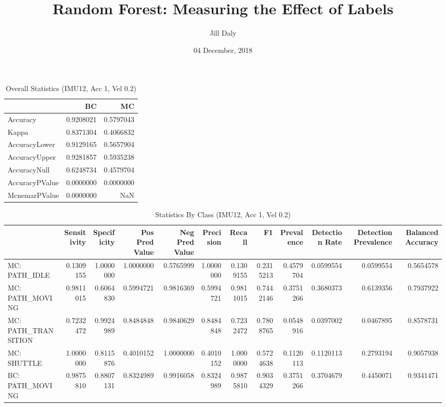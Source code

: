 \documentclass[]{article}
\title{Random Forest: Measuring the Effect of Labels}
\author{Jill Daly}
\date{04 December, 2018}
\begin{document}
\maketitle

\begin{table}[!h]

\caption{\label{tab:overall_accuracy_chunk}Overall Statistics (IMU12, Acc 1, Vel 0.2)}
\centering
\begin{tabular}[t]{lrr}
\toprule
  & BC & MC\\
\midrule
Accuracy & 0.9208021 & 0.5797043\\
Kappa & 0.8371304 & 0.4066832\\
AccuracyLower & 0.9129165 & 0.5657904\\
AccuracyUpper & 0.9281857 & 0.5935238\\
AccuracyNull & 0.6248734 & 0.4579704\\
\addlinespace
AccuracyPValue & 0.0000000 & 0.0000000\\
McnemarPValue & 0.0000000 & NaN\\
\bottomrule
\end{tabular}
\end{table}

\begin{table}[!h]

\caption{\label{tab:overall_accuracy_chunk}Statistics By Class (IMU12, Acc 1, Vel 0.2)}
\centering
\begin{tabular}[t]{lrrrrrrrrrrr}
\toprule
  & Sensitivity & Specificity & Pos Pred Value & Neg Pred Value & Precision & Recall & F1 & Prevalence & Detection Rate & Detection Prevalence & Balanced Accuracy\\
\midrule
MC: PATH\_IDLE & 0.1309155 & 1.0000000 & 1.0000000 & 0.5765999 & 1.0000000 & 0.1309155 & 0.2315213 & 0.4579704 & 0.0599554 & 0.0599554 & 0.5654578\\
MC: PATH\_MOVING & 0.9811015 & 0.6064830 & 0.5994721 & 0.9816369 & 0.5994721 & 0.9811015 & 0.7442146 & 0.3751266 & 0.3680373 & 0.6139356 & 0.7937922\\
MC: PATH\_TRANSITION & 0.7232472 & 0.9924989 & 0.8484848 & 0.9840629 & 0.8484848 & 0.7232472 & 0.7808765 & 0.0548916 & 0.0397002 & 0.0467895 & 0.8578731\\
MC: SHUTTLE & 1.0000000 & 0.8115876 & 0.4010152 & 1.0000000 & 0.4010152 & 1.0000000 & 0.5724638 & 0.1120113 & 0.1120113 & 0.2793194 & 0.9057938\\
BC: PATH\_MOVING & 0.9875810 & 0.8807131 & 0.8324989 & 0.9916058 & 0.8324989 & 0.9875810 & 0.9034329 & 0.3751266 & 0.3704679 & 0.4450071 & 0.9341471\\
\bottomrule
\end{tabular}
\end{table}
\end{document}
